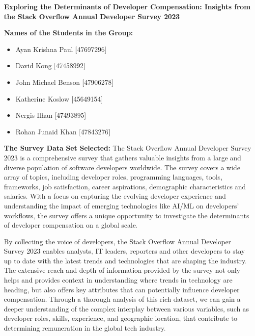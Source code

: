 \documentclass[
  12pt,
]{article}
\author{}
\date{\vspace{-2.5em}}
\begin{document}
\begin{center}
\Large\textbf{Exploring the Determinants of Developer Compensation: Insights from the Stack Overflow Annual Developer Survey 2023}
\end{center}

\textbf{Names of the Students in the Group:}

\begin{itemize}
\item
  Ayan Krishna Paul {[}47697296{]}
\item
  David Kong {[}47458992{]}
\item
  John Michael Benson {[}47906278{]}
\item
  Katherine Koslow {[}45649154{]}
\item
  Nergis Ilhan {[}47493895{]}
\item
  Rohan Junaid Khan {[}47843276{]}
\end{itemize}

\textbf{The Survey Data Set Selected:} The Stack Overflow Annual
Developer Survey 2023 is a comprehensive survey that gathers valuable
insights from a large and diverse population of software developers
worldwide. The survey covers a wide array of topics, including developer
roles, programming languages, tools, frameworks, job satisfaction,
career aspirations, demographic characteristics and salaries. With a
focus on capturing the evolving developer experience and understanding
the impact of emerging technologies like AI/ML on developers' workflows,
the survey offers a unique opportunity to investigate the determinants
of developer compensation on a global scale.

By collecting the voice of developers, the Stack Overflow Annual
Developer Survey 2023 enables analysts, IT leaders, reporters and other
developers to stay up to date with the latest trends and technologies
that are shaping the industry. The extensive reach and depth of
information provided by the survey not only helps and provides context
in understanding where trends in technology are heading, but also offers
key attributes that can potentially influence developer compensation.
Through a thorough analysis of this rich dataset, we can gain a deeper
understanding of the complex interplay between various variables, such
as developer roles, skills, experience, and geographic location, that
contribute to determining remuneration in the global tech industry.
\end{document}
